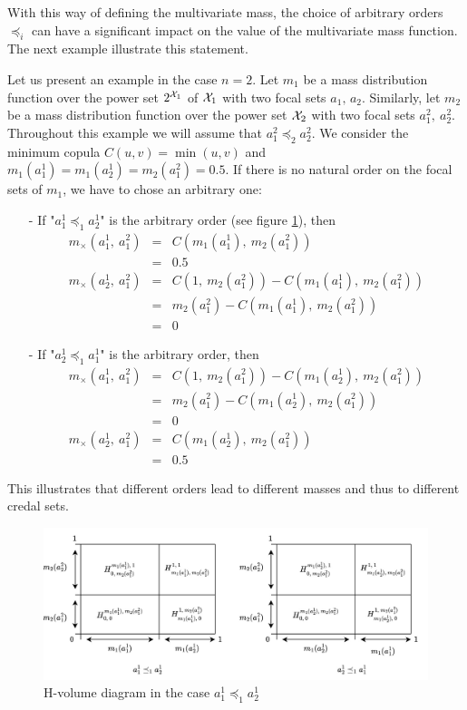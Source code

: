 With this way of defining the multivariate mass, the choice of arbitrary orders $\preceq_i$ can have a significant impact on the value of the multivariate mass function. The next example illustrate this statement.

\begin{example}\label{ex:joint_mass}
    Let us present an example in the case $n=2$. Let $m_1$ be a mass distribution function over the power set $2^{{\mathcal{X}}_1}$ of ${\mathcal{X}}_1$ with two focal sets $a_1,\, a_2$. Similarly, let $m_2$ be a mass distribution function over the power set ${\mathcal{X}}_2$ with two focal sets $a_1^2,~a_2^2$. Throughout this example we will assume that $a_1^2\preceq_2a_2^2$. We consider the minimum copula $C(u,v)=\min(u,v)$ and $m_1(a_1^1)=m_1(a_2^1)=m_2(a_1^2)=0.5$.
    If there is no natural order on the focal sets of $m_1$, we have to chose an arbitrary one:
    \begin{itemize}
        \item[-] If "$a_1^1\preceq_1a_2^1$" is the arbitrary order (see figure \ref{fig:joint_distrib_arb}), then
        \begin{eqnarray*}
            m_\times(a_1^1,~a_1^2) &=& C(m_1(a_1^1),~m_2(a_1^2))\\
            &=& 0.5\\
            m_\times(a_2^1,~a_1^2) &=& C(1,~m_2(a_1^2)) - C(m_1(a_1^1),~m_2(a_1^2))\\
            &=& m_2(a_1^2) - C(m_1(a_1^1),~m_2(a_1^2))\\
            &=& 0
        \end{eqnarray*}
        \item[-] If "$a_2^1\preceq_1a_1^1$" is the arbitrary order, then
        \begin{eqnarray*}
            m_\times(a_1^1,~a_1^2) &=& C(1,~m_2(a_1^2)) - C(m_1(a_2^1),~m_2(a_1^2))\\
            &=& m_2(a_1^2) - C(m_1(a_2^1),~m_2(a_1^2))\\
            &=& 0\\
            m_\times(a_2^1,~a_1^2) &=& C(m_1(a_2^1),~m_2(a_1^2))\\
            &=& 0.5
        \end{eqnarray*}
    \end{itemize}
    This illustrates that different orders lead to different masses and thus to different credal sets.
    \begin{figure}[!ht]
        \centering
        \includegraphics[width=\linewidth]{Images/M_mass_h_volume.jpg}
        \caption{H-volume diagram in the case $a_1^1\preceq_1a_2^1$}
        \label{fig:joint_distrib_arb}
    \end{figure}
\end{example}

